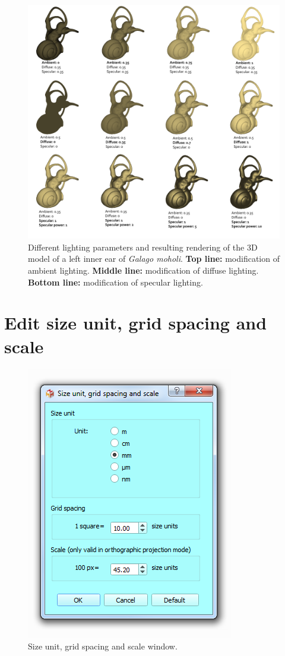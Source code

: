 \begin{figure}
  \centering
  \includegraphics[scale=0.3]{images/08/lighting.png} 
	\caption{Different lighting parameters and resulting rendering of the 3D model of a left inner ear of \textit{Galago moholi}. \textbf{Top line:} modification of ambient lighting. \textbf{Middle line:} modification of diffuse lighting. \textbf{Bottom line:} modification of specular lighting.}
\label{lighting}
 
\end{figure}


\section{Edit size unit, grid spacing and scale}
\begin{figure}
  \centering
  \includegraphics[scale=0.55]{images/08/size_unit_grid_spacing.png} 
	\caption{Size unit, grid spacing and scale window.}
\label{size_unit_grid_spacing}
 
\end{figure}

